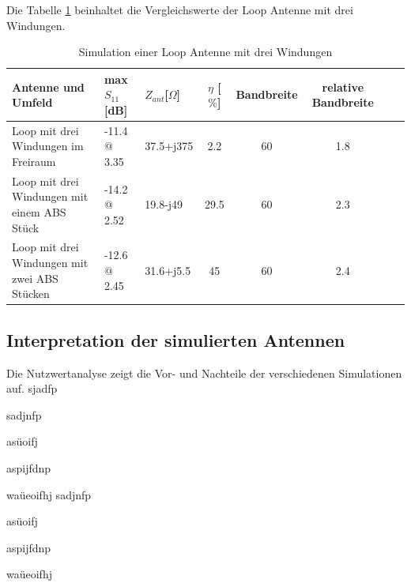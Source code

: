 Die Tabelle \ref{tab:Evaluation_Vergeich_Loop_Antennen_Coil} beinhaltet die Vergleichswerte der Loop Antenne mit drei Windungen.
\begin{table}[!h]
 \centering
 \begin{tabular}{p{4cm} p{2cm} l c c c c r} 
 \toprule 
 Antenne und Umfeld & max $S_{11}$[dB]		& $Z_{ant}$[$\Omega$] 	& $\eta$ [$\%$] & Bandbreite & relative Bandbreite\\ 
 \midrule
Loop mit drei Windungen im Freiraum 		&	-11.4 @ 3.35		& 	37.5+j375			& 	2.2	& 60		& 1.8\\ 					 		
Loop mit drei Windungen mit einem ABS Stück 	& -14.2 @ 2.52 		&	19.8-j49			&	29.5	& 60	 	& 2.3\\
Loop mit drei Windungen mit zwei ABS Stücken & -12.6 @ 2.45 	&	31.6+j5.5		&	45	& 60 	& 2.4\\
 \bottomrule
 \end{tabular}
 \caption{Simulation einer Loop Antenne mit drei Windungen }
 \label{tab:Evaluation_Vergeich_Loop_Antennen_Coil}
\end{table}
\subsection{Interpretation der simulierten Antennen}

Die Nutzwertanalyse zeigt die Vor- und Nachteile der verschiedenen Simulationen auf.
sjadfp

sadjnfp

asüoifj

aspijfdnp


waüeoifhj
sadjnfp

asüoifj

aspijfdnp


waüeoifhj

\newpage
